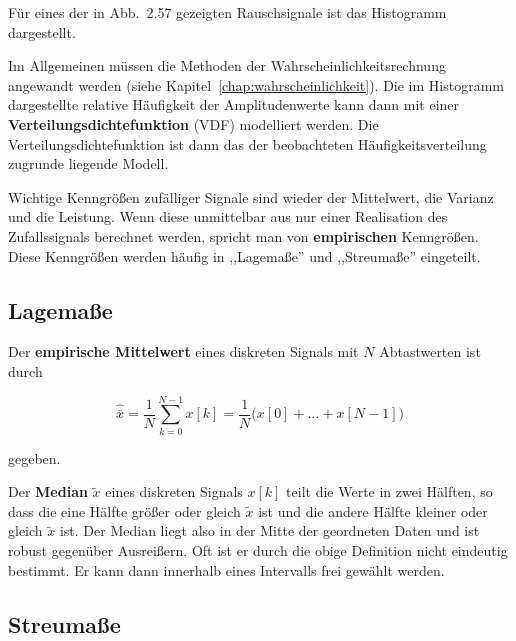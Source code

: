 \begin{beispiel}
Für eines der in Abb.\ 2.57 gezeigten Rauschsignale ist das Histogramm dargestellt.

\end{beispiel}

Im Allgemeinen müssen die Methoden der Wahrscheinlichkeitsrechnung angewandt werden (siehe Kapitel~\ref{chap:wahrscheinlichkeit}). Die im Histogramm dargestellte relative Häufigkeit der Amplitudenwerte kann dann mit einer \textbf{Verteilungsdichtefunktion} (VDF) modelliert werden. Die Verteilungsdichtefunktion ist dann das der beobachteten Häufigkeitsverteilung zugrunde liegende Modell.

Wichtige Kenngrößen zufälliger Signale sind wieder der Mittelwert, die Varianz und die Leistung. Wenn diese unmittelbar aus nur einer Realisation des Zufallssignals berechnet werden, spricht man von \textbf{empirischen} Kenngrößen. Diese Kenngrößen werden häufig in ,,Lagemaße'' und ,,Streumaße'' eingeteilt.

\subsection{Lagemaße}
\label{sec:lagemasse}

\begin{definition}
Der \textbf{empirische Mittelwert} eines diskreten Signals mit $N$ Abtastwerten ist durch

$$
\hat{\bar{x}} = \frac{1}{N} \sum_{k=0}^{N-1} x[k] = \frac{1}{N}\bigl(x[0] + \ldots + x[N-1]\bigr)
$$

gegeben.
\end{definition}

\begin{definition}[Median]
Der \textbf{Median} $\tilde{x}$ eines diskreten Signals $x[k]$ teilt die Werte in zwei Hälften, so dass die eine Hälfte größer oder gleich $\tilde{x}$ ist und die andere Hälfte kleiner oder gleich $\tilde{x}$ ist.
Der Median liegt also in der Mitte der geordneten Daten und ist robust gegenüber Ausreißern. Oft ist er durch die obige Definition nicht eindeutig bestimmt. Er kann dann innerhalb eines Intervalls frei gewählt werden.
\end{definition}

\subsection{Streumaße}
\label{sec:streumasse}

